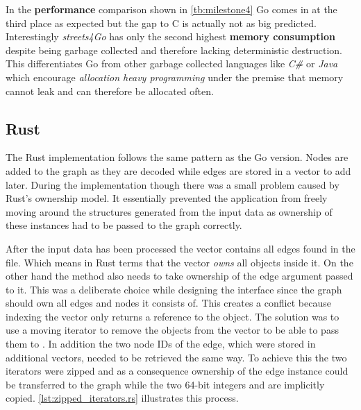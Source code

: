 In the \textbf{performance} comparison shown in \autoref{tb:milestone4} Go comes in at the third place as expected but the gap to C is actually not as big predicted. Interestingly \textit{streets4Go} has only the second highest \textbf{memory consumption} despite being garbage collected and therefore lacking deterministic destruction. This differentiates Go from other garbage collected languages like \textit{C\#} or \textit{Java} which encourage \textit{allocation heavy programming} under the premise that memory cannot leak and can therefore be allocated often.

\subsection{Rust}
\label{subsec:Implementation::SequentialBenchmark::Rust}

The Rust implementation follows the same pattern as the Go version. Nodes are added to the graph as they are decoded while edges are stored in a vector to add later. During the implementation though there was a small problem caused by Rust's ownership model. It essentially prevented the application from freely moving around the structures generated from the input data as ownership of these instances had to be passed to the graph correctly.

After the input data has been processed the  vector contains all edges found in the file. Which means in Rust terms that the vector \textit{owns} all objects inside it. On the other hand the  method also needs to take ownership of the edge argument passed to it. This was a deliberate choice while designing the interface since the graph should own all edges and nodes it consists of. This creates a conflict because indexing the vector only returns a reference to the object. The solution was to use a moving iterator to remove the objects from the vector to be able to pass them to . In addition the two node IDs of the edge, which were stored in additional vectors, needed to be retrieved the same way. To achieve this the two iterators were zipped and as a consequence ownership of the edge instance could be transferred to the graph while the two 64-bit integers  and  are implicitly copied. \autoref{lst:zipped_iterators.rs} illustrates this process.
\\


